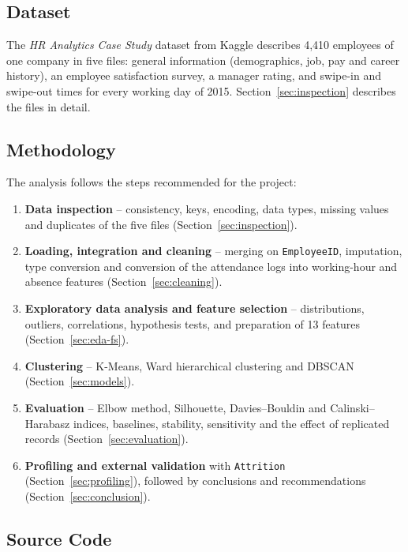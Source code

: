 \documentclass[12pt,a4paper]{article}
\begin{document}
\subsection{Dataset}

The \emph{HR Analytics Case Study} dataset from Kaggle describes 4,410
employees of one company in five files: general information (demographics,
job, pay and career history), an employee satisfaction survey, a manager
rating, and swipe-in and swipe-out times for every working day of 2015.
Section~\ref{sec:inspection} describes the files in detail.

\subsection{Methodology}

The analysis follows the steps recommended for the project:
\begin{enumerate}
  \item \textbf{Data inspection} -- consistency, keys, encoding, data types,
  missing values and duplicates of the five files
  (Section~\ref{sec:inspection}).
  \item \textbf{Loading, integration and cleaning} -- merging on
  \texttt{EmployeeID}, imputation, type conversion and conversion of the
  attendance logs into working-hour and absence features
  (Section~\ref{sec:cleaning}).
  \item \textbf{Exploratory data analysis and feature selection} --
  distributions, outliers, correlations, hypothesis tests, and preparation of
  13 features (Section~\ref{sec:eda-fs}).
  \item \textbf{Clustering} -- K-Means, Ward hierarchical clustering and
  DBSCAN (Section~\ref{sec:models}).
  \item \textbf{Evaluation} -- Elbow method, Silhouette, Davies--Bouldin and
  Calinski--Harabasz indices, baselines, stability, sensitivity and the
  effect of replicated records (Section~\ref{sec:evaluation}).
  \item \textbf{Profiling and external validation} with \texttt{Attrition}
  (Section~\ref{sec:profiling}), followed by conclusions and recommendations
  (Section~\ref{sec:conclusion}).
\end{enumerate}

\subsection{Source Code}
\end{document}
